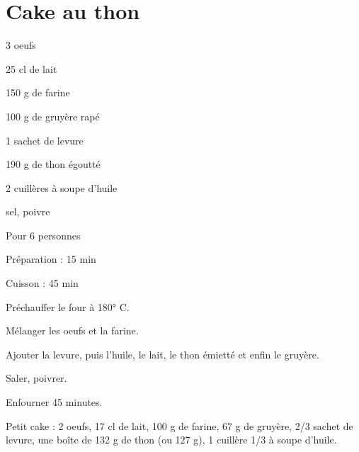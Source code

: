 \section[\normalsize{Cake au thon}]{Cake au thon}

\begin{ingredients}
\item 3 oeufs
\item 25 cl de lait
\item 150 g de farine
\item 100 g de gruy\`ere rap\'e
\item 1 sachet de levure
\item 190 g de thon \'egoutt\'e
\item 2 cuill\`eres \`a soupe d'huile
\item sel, poivre 
\end{ingredients}
\begin{infos}
\item Pour 6 personnes
\item Préparation : 15 min
\item Cuisson : 45 min
\end{infos}
\begin{etapes}
\item Pr\'echauffer le four à 180° C.
\item M\'elanger les oeufs et la farine.
\item Ajouter la levure, puis l'huile, le lait, le thon \'emiett\'e et enfin le gruy\`ere.
\item Saler, poivrer.
\item Enfourner 45 minutes. 
\end{etapes}
\begin{conseils}
Petit cake : 2 oeufs, 17 cl de lait, 100 g de farine, 67 g de gruy\`ere, 2/3 sachet de levure, une bo\^ite de 132 g de thon (ou 127 g), 1 cuill\`ere 1/3 \`a soupe d'huile.
\end{conseils}
